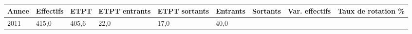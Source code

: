 \begin{longtable}[]{@{}lllllllll@{}}
\toprule
\begin{minipage}[b]{0.05\columnwidth}\raggedright
Annee\strut
\end{minipage} & \begin{minipage}[b]{0.08\columnwidth}\raggedright
Effectifs\strut
\end{minipage} & \begin{minipage}[b]{0.05\columnwidth}\raggedright
ETPT\strut
\end{minipage} & \begin{minipage}[b]{0.10\columnwidth}\raggedright
ETPT entrants\strut
\end{minipage} & \begin{minipage}[b]{0.10\columnwidth}\raggedright
ETPT sortants\strut
\end{minipage} & \begin{minipage}[b]{0.07\columnwidth}\raggedright
Entrants\strut
\end{minipage} & \begin{minipage}[b]{0.07\columnwidth}\raggedright
Sortants\strut
\end{minipage} & \begin{minipage}[b]{0.11\columnwidth}\raggedright
Var. effectifs\strut
\end{minipage} & \begin{minipage}[b]{0.14\columnwidth}\raggedright
Taux de rotation \%\strut
\end{minipage}\tabularnewline
\midrule
\endhead
\begin{minipage}[t]{0.05\columnwidth}\raggedright
2011\strut
\end{minipage} & \begin{minipage}[t]{0.08\columnwidth}\raggedright
415,0\strut
\end{minipage} & \begin{minipage}[t]{0.05\columnwidth}\raggedright
405,6\strut
\end{minipage} & \begin{minipage}[t]{0.10\columnwidth}\raggedright
22,0\strut
\end{minipage} & \begin{minipage}[t]{0.10\columnwidth}\raggedright
17,0\strut
\end{minipage} & \begin{minipage}[t]{0.07\columnwidth}\raggedright
40,0\strut
\end{minipage} & \begin{minipage}[t]{0.07\columnwidth}\raggedright

\end{minipage}
\end{longtable}
